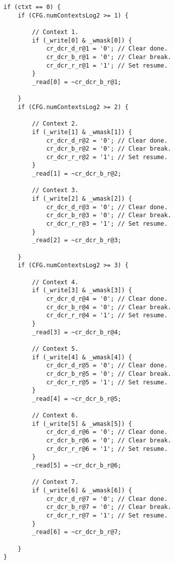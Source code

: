 \implementation{}
\begin{lstlisting}
if (ctxt == 0) {
    if (CFG.numContextsLog2 >= 1) {
        
        // Context 1.
        if (_write[0] & _wmask[0]) {
            cr_dcr_d_r@1 = '0'; // Clear done.
            cr_dcr_b_r@1 = '0'; // Clear break.
            cr_dcr_r_r@1 = '1'; // Set resume.
        }
        _read[0] = ~cr_dcr_b_r@1;
        
    }
    if (CFG.numContextsLog2 >= 2) {
        
        // Context 2.
        if (_write[1] & _wmask[1]) {
            cr_dcr_d_r@2 = '0'; // Clear done.
            cr_dcr_b_r@2 = '0'; // Clear break.
            cr_dcr_r_r@2 = '1'; // Set resume.
        }
        _read[1] = ~cr_dcr_b_r@2;
        
        // Context 3.
        if (_write[2] & _wmask[2]) {
            cr_dcr_d_r@3 = '0'; // Clear done.
            cr_dcr_b_r@3 = '0'; // Clear break.
            cr_dcr_r_r@3 = '1'; // Set resume.
        }
        _read[2] = ~cr_dcr_b_r@3;
        
    }
    if (CFG.numContextsLog2 >= 3) {
        
        // Context 4.
        if (_write[3] & _wmask[3]) {
            cr_dcr_d_r@4 = '0'; // Clear done.
            cr_dcr_b_r@4 = '0'; // Clear break.
            cr_dcr_r_r@4 = '1'; // Set resume.
        }
        _read[3] = ~cr_dcr_b_r@4;
        
        // Context 5.
        if (_write[4] & _wmask[4]) {
            cr_dcr_d_r@5 = '0'; // Clear done.
            cr_dcr_b_r@5 = '0'; // Clear break.
            cr_dcr_r_r@5 = '1'; // Set resume.
        }
        _read[4] = ~cr_dcr_b_r@5;
        
        // Context 6.
        if (_write[5] & _wmask[5]) {
            cr_dcr_d_r@6 = '0'; // Clear done.
            cr_dcr_b_r@6 = '0'; // Clear break.
            cr_dcr_r_r@6 = '1'; // Set resume.
        }
        _read[5] = ~cr_dcr_b_r@6;
        
        // Context 7.
        if (_write[6] & _wmask[6]) {
            cr_dcr_d_r@7 = '0'; // Clear done.
            cr_dcr_b_r@7 = '0'; // Clear break.
            cr_dcr_r_r@7 = '1'; // Set resume.
        }
        _read[6] = ~cr_dcr_b_r@7;
        
    }
}
\end{lstlisting}

